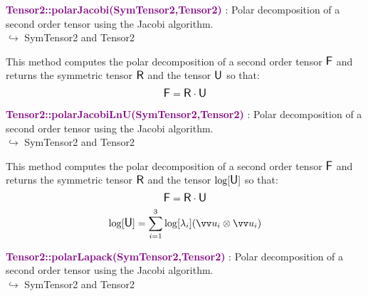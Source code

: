 \textcolor{purple}{\textbf{Tensor2::polarJacobi(SymTensor2,Tensor2)}}\label{Tensor2::polarJacobi(SymTensor2,Tensor2)} : Polar decomposition of a second order tensor using the Jacobi algorithm.\\ \hspace*{5mm}$\hookrightarrow$ SymTensor2 and Tensor2

This method computes the polar decomposition of a second order tensor $\mbox{\large\ensuremath{\mathsf{F}}}$ and returns the symmetric tensor $\mbox{\large\ensuremath{\mathsf{R}}}$ and the tensor $\mbox{\large\ensuremath{\mathsf{U}}}$ so that:
\begin{equation*}
\mbox{\large\ensuremath{\mathsf{F}}} = \mbox{\large\ensuremath{\mathsf{R}}} \cdot \mbox{\large\ensuremath{\mathsf{U}}}
\end{equation*}

\textcolor{purple}{\textbf{Tensor2::polarJacobiLnU(SymTensor2,Tensor2)}}\label{Tensor2::polarJacobiLnU(SymTensor2,Tensor2)} : Polar decomposition of a second order tensor using the Jacobi algorithm.\\ \hspace*{5mm}$\hookrightarrow$ SymTensor2 and Tensor2

This method computes the polar decomposition of a second order tensor $\mbox{\large\ensuremath{\mathsf{F}}}$ and returns the symmetric tensor $\mbox{\large\ensuremath{\mathsf{R}}}$ and the tensor $\log[\mbox{\large\ensuremath{\mathsf{U}}}]$ so that:
\begin{equation*}
\mbox{\large\ensuremath{\mathsf{F}}} = \mbox{\large\ensuremath{\mathsf{R}}} \cdot \mbox{\large\ensuremath{\mathsf{U}}}
\end{equation*}
\begin{equation*}
\log [\U] =\sum _{i=1}^{3}\log[\lambda_{i}](\overrightarrow{u}_{i}\otimes \overrightarrow{u}_{i})
\end{equation*}

\textcolor{purple}{\textbf{Tensor2::polarLapack(SymTensor2,Tensor2)}}\label{Tensor2::polarLapack(SymTensor2,Tensor2)} : Polar decomposition of a second order tensor using the Jacobi algorithm.\\ \hspace*{5mm}$\hookrightarrow$ SymTensor2 and Tensor2

